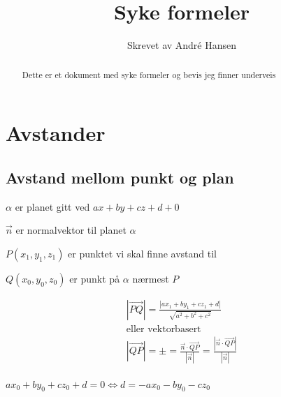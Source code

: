 \documentclass{article}
\title{Syke formeler}
\author{Skrevet av André Hansen}
\begin{document}
\maketitle

\begin{abstract}
Dette er et dokument med syke formeler og bevis jeg finner underveis
\end{abstract}

\section{Avstander}

\subsection{Avstand mellom punkt og plan}

$\alpha$ er planet gitt ved $ax+by+cz+d+0$

$\vec{n}$ er normalvektor til planet $\alpha$

$P(x_1,y_1,z_1)$ er punktet vi skal finne avstand til

$Q(x_0, y_0, z_0)$ er punkt på $\alpha$ nærmest $P$

\begin{align*}
    |\vec{PQ}|=\frac{|ax_1+by_1+cz_1+d|}{\sqrt{a^2+b^2+c^2}} \\
    \text{eller vektorbasert} \\
    |\vec{QP}|=\pm=\frac{\vec{n}\cdot\vec{QP}}{|\vec{n}|}=\frac{|\vec{n}\cdot\vec{QP}|}{|\vec{n}|} \\
\end{align*}




$ax_0+by_0+cz_0+d=0 \Leftrightarrow d=-ax_0-by_0-cz_0$


\end{document}
